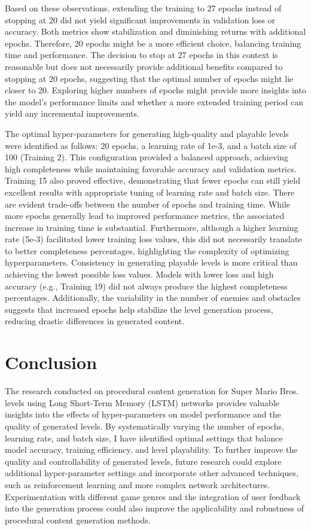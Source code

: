 \documentclass[runningheads]{llncs}
\begin{document}
Based on these observations, extending the training to 27 epochs instead of stopping at 20 did not yield significant improvements in validation loss or accuracy. Both metrics show stabilization and diminishing returns with additional epochs. Therefore, 20 epochs might be a more efficient choice, balancing training time and performance. The decision to stop at 27 epochs in this context is reasonable but does not necessarily provide additional benefits compared to stopping at 20 epochs, suggesting that the optimal number of epochs might lie closer to 20. Exploring higher numbers of epochs might provide more insights into the model's performance limits and whether a more extended training period can yield any incremental improvements.


The optimal hyper-parameters for generating high-quality and playable levels were identified as follows: 20 epochs, a learning rate of 1e-3, and a batch size of 100 (Training 2). This configuration provided a balanced approach, achieving high completeness while maintaining favorable accuracy and validation metrics. Training 15 also proved effective, demonstrating that fewer epochs can still yield excellent results with appropriate tuning of learning rate and batch size. There are evident trade-offs between the number of epochs and training time. While more epochs generally lead to improved performance metrics, the associated increase in training time is substantial. Furthermore, although a higher learning rate (5e-3) facilitated lower training loss values, this did not necessarily translate to better completeness percentages, highlighting the complexity of optimizing hyperparameters. Consistency in generating playable levels is more critical than achieving the lowest possible loss values. Models with lower loss and high accuracy (e.g., Training 19) did not always produce the highest completeness percentages. Additionally, the variability in the number of enemies and obstacles suggests that increased epochs help stabilize the level generation process, reducing drastic differences in generated content.


\section{Conclusion}
The research conducted on procedural content generation for Super Mario Bros. levels using Long Short-Term Memory (LSTM) networks provides valuable insights into the effects of hyper-parameters on model performance and the quality of generated levels. By systematically varying the number of epochs, learning rate, and batch size, I have identified optimal settings that balance model accuracy, training efficiency, and level playability. To further improve the quality and controllability of generated levels, future research could explore additional hyper-parameter settings and incorporate other advanced techniques, such as reinforcement learning and more complex network architectures. Experimentation with different game genres and the integration of user feedback into the generation process could also improve the applicability and robustness of procedural content generation methods.
\end{document}
